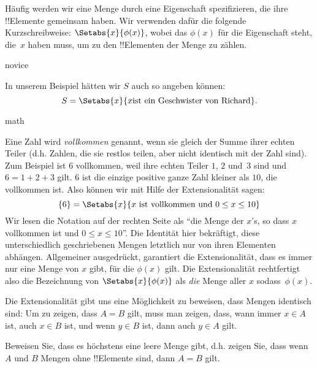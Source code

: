 \documentclass[../../../include/open-logic-section]{subfiles}
\begin{document}
Häufig werden wir eine Menge durch eine Eigenschaft spezifizieren, die ihre !!{Element}e
gemeinsam haben. Wir verwenden dafür die folgende Kurzschreibweise:
$\Setabs{x}{\phi(x)}$, wobei das $\phi(x)$ für die Eigenschaft steht,
die~$x$ haben muss, um zu den !!{Element}en der Menge zu zählen.

\begin{tagblock}{novice}
\begin{ex}
In unserem Beispiel hätten wir $S$ auch so angeben können:
\[
S = \Setabs{x}{x \text{ist ein Geschwister von Richard}}.
\]
\end{ex}
\end{tagblock}

\begin{tagblock}{math}
\begin{ex}
Eine Zahl wird \emph{vollkommen} genannt, wenn sie gleich der Summe ihrer
echten Teiler (d.h. Zahlen, die sie restlos teilen, aber nicht
identisch mit der Zahl sind). Zum Beispiel ist $6$ vollkommen, weil ihre
echten Teiler $1$, $2$ und~$3$ sind und $6 = 1 + 2 + 3$ gilt. $6$ ist die einzige positive ganze Zahl kleiner als $10$, die vollkommen ist. Also
können wir mit Hilfe der Extensionalität sagen:
\[
	\{6\} = \Setabs{x}{x\text{ ist vollkommen und }0 \leq x \leq 10}
\]
Wir lesen die Notation auf der rechten Seite als ``die Menge der $x$'s, so dass $x$
vollkommen ist und $0 \leq x \leq 10$''. Die Identität hier bekräftigt, diese unterschiedlich 
geschriebenen Mengen letztlich nur von ihren Elementen abhängen.
Allgemeiner ausgedrückt, garantiert die Extensionalität, dass es immer
nur eine Menge von $x$ gibt, für die $\phi(x)$ gilt.
Die Extensionalität rechtfertigt also die Bezeichnung von 
$\Setabs{x}{\phi(x)}$ als \emph{die} Menge aller $x$ sodass~$\phi(x)$.
\end{ex}
\end{tagblock}

Die Extensionalität gibt uns eine Möglichkeit zu beweisen, dass Mengen identisch sind: Um zu zeigen, dass $A = B$ gilt, muss man zeigen, dass, wann immer $x \in A$ ist, auch $x \in B$ ist,
und wenn $y \in B$ ist, dann auch $y \in A$ gilt.

\begin{prob}
Beweisen Sie, dass es höchstens eine leere Menge gibt, d.h. zeigen Sie, dass wenn $A$ und $B$
Mengen ohne !!{Element}e sind, dann $A = B$ gilt.
\end{prob}
\end{document}
